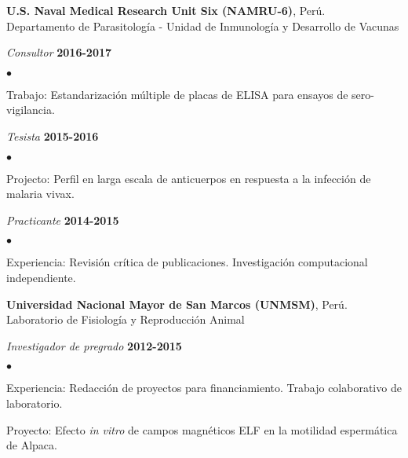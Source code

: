 \documentclass[margin,line]{res}
\newenvironment{list1}{
	\begin{list}{\ding{113}}{%
			\setlength{\itemsep}{0in}
			\setlength{\parsep}{0in} \setlength{\parskip}{0in}
			\setlength{\topsep}{0in} \setlength{\partopsep}{0in}
			\setlength{\leftmargin}{0.17in}}}{\end{list}}
\newenvironment{list2}{
	\begin{list}{$\bullet$}{%
			\setlength{\itemsep}{0in}
			\setlength{\parsep}{0in} \setlength{\parskip}{0in}
			\setlength{\topsep}{0in} \setlength{\partopsep}{0in}
			\setlength{\leftmargin}{0.2in}}}{\end{list}}
\begin{document}
\begin{resume}
		{\bf U.S. Naval Medical Research Unit Six (NAMRU-6)}, Perú.\\
		Departamento de Parasitología - Unidad de Inmunología y Desarrollo de Vacunas\\
		\vspace*{-.1in}
		\begin{list1}
			\item[] {\em Consultor} \hfill {\bf 2016-2017}\\
			\vspace*{-.1in}
			\begin{list2}
				\item Trabajo: Estandarización múltiple de placas de ELISA para ensayos de sero-vigilancia.\\
			\end{list2}
			\vspace*{-.1in}
			\item[] {\em Tesista} \hfill {\bf 2015-2016}\\
			\vspace*{-.1in}
			\begin{list2}
				\item Projecto: Perfil en larga escala de anticuerpos en respuesta a la infección de malaria vivax.\\
			\end{list2}
			\vspace*{-.1in}
			\item[] {\em Practicante} \hfill {\bf 2014-2015}\\
			\vspace*{-.1in}
			\begin{list2} %
				\item Experiencia: Revisión crítica de publicaciones. Investigación computacional independiente.
			\end{list2}
		\end{list1}
		
		{\bf Universidad Nacional Mayor de San Marcos (UNMSM)}, Perú.\\
		Laboratorio de Fisiología y Reproducción Animal\\
		\vspace*{-.1in}
		\begin{list1}
			\item[] {\em Investigador de pregrado} \hfill {\bf 2012-2015}\\
			\vspace*{-.1in}
			\begin{list2}
				\item Experiencia: Redacción de proyectos para financiamiento. Trabajo colaborativo de laboratorio.
				\item Proyecto: Efecto \textit{in vitro} de campos magnéticos ELF en la motilidad espermática de Alpaca.\\
			\end{list2}
		\end{list1}
		

\end{resume}
\end{document}
